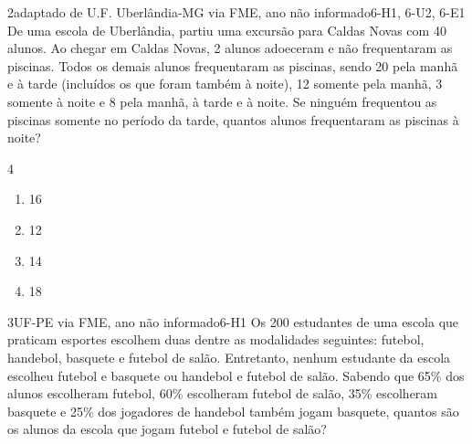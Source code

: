 \begin{questao}{2}{adaptado de U.F. Uberlândia-MG via FME, ano não informado}{6-H1, 6-U2, 6-E1}\label{u6:ufu33}
De uma escola de Uberlândia, partiu uma excursão para Caldas Novas com 40 alunos. Ao chegar em Caldas Novas, 2 alunos adoeceram e não frequentaram as piscinas. Todos os demais alunos frequentaram as piscinas, sendo 20 pela manhã e à tarde (incluídos os que foram também à noite), 12 somente pela manhã, 3 somente à noite e 8 pela manhã, à tarde e à noite. Se ninguém frequentou as piscinas somente no período da tarde, quantos alunos frequentaram as piscinas à noite?
\begin{multicols}{4}
\begin{enumerate}[label=\alph*)]
  \item 16
  \item 12
  \item 14
  \item 18
\end{enumerate}
\end{multicols}
\end{questao}

\begin{questao}{3}{UF-PE via FME, ano não informado}{6-H1}\label{u6:ufpe19}
Os 200 estudantes de uma escola que praticam esportes escolhem duas dentre as modalidades seguintes: futebol, handebol, basquete e futebol de salão. Entretanto, nenhum estudante da escola escolheu futebol e basquete ou handebol e futebol de salão. Sabendo que 65\% dos alunos escolheram futebol, 60\% escolheram futebol de salão, 35\% escolheram basquete e 25\% dos jogadores de handebol também jogam basquete, quantos são os alunos da escola que jogam futebol e futebol de salão?
\end{questao}

